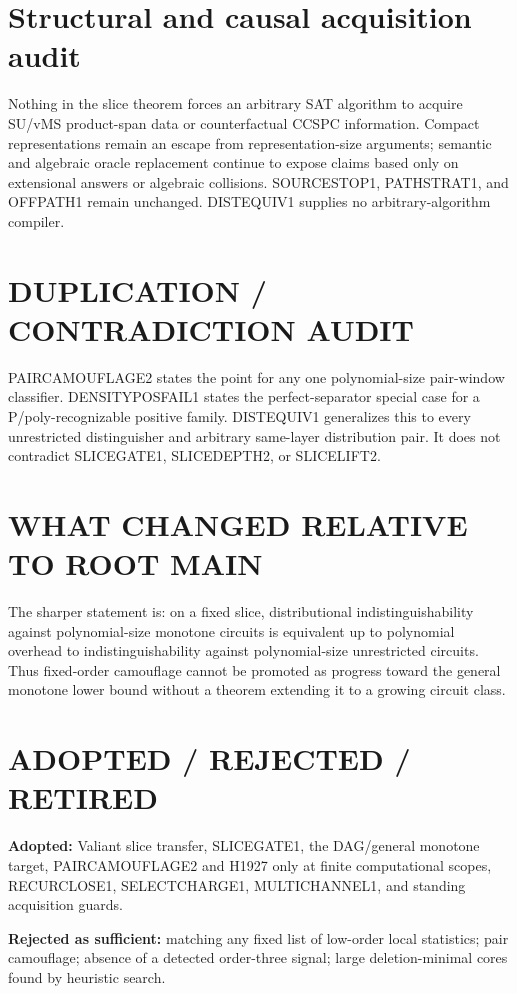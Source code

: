 \documentclass[11pt]{article}
\begin{document}
\section*{Structural and causal acquisition audit}
Nothing in the slice theorem forces an arbitrary SAT algorithm to acquire SU/vMS product-span data or counterfactual CCSPC information. Compact representations remain an escape from representation-size arguments; semantic and algebraic oracle replacement continue to expose claims based only on extensional answers or algebraic collisions. SOURCESTOP1, PATHSTRAT1, and OFFPATH1 remain unchanged. DISTEQUIV1 supplies no arbitrary-algorithm compiler.

\section*{DUPLICATION / CONTRADICTION AUDIT}
PAIRCAMOUFLAGE2 states the point for any one polynomial-size pair-window classifier. DENSITYPOSFAIL1 states the perfect-separator special case for a P/poly-recognizable positive family. DISTEQUIV1 generalizes this to every unrestricted distinguisher and arbitrary same-layer distribution pair. It does not contradict SLICEGATE1, SLICEDEPTH2, or SLICELIFT2.

\section*{WHAT CHANGED RELATIVE TO ROOT MAIN}
The sharper statement is: on a fixed slice, distributional indistinguishability against polynomial-size monotone circuits is equivalent up to polynomial overhead to indistinguishability against polynomial-size unrestricted circuits. Thus fixed-order camouflage cannot be promoted as progress toward the general monotone lower bound without a theorem extending it to a growing circuit class.

\section*{ADOPTED / REJECTED / RETIRED}
\textbf{Adopted:} Valiant slice transfer, SLICEGATE1, the DAG/general monotone target, PAIRCAMOUFLAGE2 and H1927 only at finite computational scopes, RECURCLOSE1, SELECTCHARGE1, MULTICHANNEL1, and standing acquisition guards.

\textbf{Rejected as sufficient:} matching any fixed list of low-order local statistics; pair camouflage; absence of a detected order-three signal; large deletion-minimal cores found by heuristic search.
\end{document}
